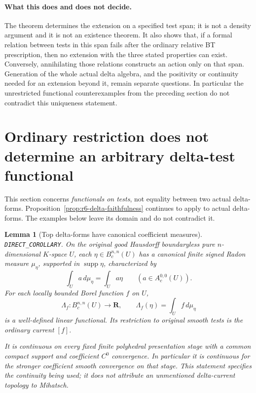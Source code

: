 \documentclass[11pt,a4paper]{article}
\numberwithin{equation}{section}
\newtheorem{lemma}[theorem]{Lemma}
\theoremstyle{definition}
\theoremstyle{remark}
\begin{document}
\paragraph{What this does and does not decide.}
The theorem determines the extension on a specified test span;
it is not a density argument and it is not an existence theorem.
It also shows that, if a formal relation between tests in this
span fails after the ordinary relative BT prescription, then no
extension with the three stated properties can exist.  Conversely,
annihilating those relations constructs an action only on that
span.  Generation of the whole actual delta algebra, and the
positivity or continuity needed for an extension beyond it,
remain separate questions.  In particular the unrestricted
functional counterexamples from the preceding section do not
contradict this uniqueness statement.



\section{Ordinary restriction does not determine an arbitrary delta-test functional}
\label{sec:r6-delta-test-extension-obstructions}

This section concerns \emph{functionals on tests}, not equality between
two actual delta-forms.  Proposition~\ref{prop:r6-delta-faithfulness}
continues to apply to actual delta-forms.  The examples below leave its
domain and do not contradict it.

\begin{lemma}[Top delta-forms have canonical coefficient measures]
\label{lem:r6-delta-top-radon}
\textnormal{\texttt{DIRECT\_COROLLARY}.}
On the original good Hausdorff boundaryless pure $n$-dimensional
$K$-space $U$, each $\eta\in B_c^{n,n}(U)$ has a canonical finite
signed Radon measure $\mu_\eta$, supported in $\operatorname{supp}\eta$,
characterized by
\[
                  \int_U a\,d\mu_\eta=\int_U a\eta
                  \qquad(a\in A_c^{0,0}(U)).
\]
For each locally bounded Borel function $f$ on $U$,
\[
       \Lambda_f:B_c^{n,n}(U)\longrightarrow\mathbf R,
       \qquad \Lambda_f(\eta)=\int_U f\,d\mu_\eta
\]
is a well-defined linear functional.  Its restriction to original
smooth tests is the ordinary current $[f]$.

It is continuous on every fixed finite polyhedral presentation stage
with a common compact support and coefficient $C^0$ convergence.
In particular it is continuous for the stronger coefficient smooth
convergence on that stage.  This statement specifies the continuity
being used; it does not attribute an unmentioned delta-current
topology to Mihatsch.
\end{lemma}
\end{document}
